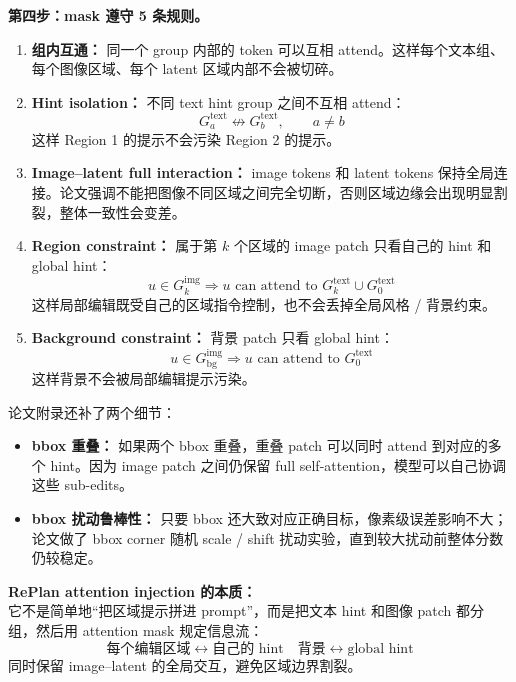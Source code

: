 \textbf{第四步：mask 遵守 5 条规则。}

\begin{enumerate}[leftmargin=1.5em]
  \item \textbf{组内互通：} 同一个 group 内部的 token 可以互相 attend。这样每个文本组、每个图像区域、每个 latent 区域内部不会被切碎。
  \item \textbf{Hint isolation：} 不同 text hint group 之间不互相 attend：
  \[
  G^\text{text}_a
  \not\leftrightarrow
  G^\text{text}_b,
  \qquad
  a\neq b
  \]
  这样 Region 1 的提示不会污染 Region 2 的提示。
  \item \textbf{Image--latent full interaction：} image tokens 和 latent tokens 保持全局连接。论文强调不能把图像不同区域之间完全切断，否则区域边缘会出现明显割裂，整体一致性会变差。
  \item \textbf{Region constraint：} 属于第 $k$ 个区域的 image patch 只看自己的 hint 和 global hint：
  \[
  u\in G^\text{img}_k
  \Rightarrow
  u
  \text{ can attend to }
  G^\text{text}_k
  \cup
  G^\text{text}_0
  \]
  这样局部编辑既受自己的区域指令控制，也不会丢掉全局风格 / 背景约束。
  \item \textbf{Background constraint：} 背景 patch 只看 global hint：
  \[
  u\in G^\text{img}_\text{bg}
  \Rightarrow
  u
  \text{ can attend to }
  G^\text{text}_0
  \]
  这样背景不会被局部编辑提示污染。
\end{enumerate}

论文附录还补了两个细节：

\begin{itemize}[leftmargin=1.5em]
  \item \textbf{bbox 重叠：} 如果两个 bbox 重叠，重叠 patch 可以同时 attend 到对应的多个 hint。因为 image patch 之间仍保留 full self-attention，模型可以自己协调这些 sub-edits。
  \item \textbf{bbox 扰动鲁棒性：} 只要 bbox 还大致对应正确目标，像素级误差影响不大；论文做了 bbox corner 随机 scale / shift 扰动实验，直到较大扰动前整体分数仍较稳定。
\end{itemize}

\begin{summarybox}
\textbf{RePlan attention injection 的本质：}\\
它不是简单地“把区域提示拼进 prompt”，而是把文本 hint 和图像 patch 都分组，然后用 attention mask 规定信息流：
\[
\text{每个编辑区域}
\longleftrightarrow
\text{自己的 hint}
\quad
\text{背景}
\longleftrightarrow
\text{global hint}
\]
同时保留 image--latent 的全局交互，避免区域边界割裂。
\end{summarybox}


